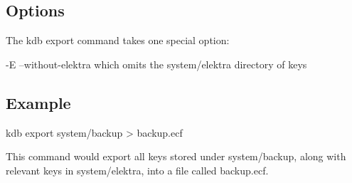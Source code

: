 \subsection*{Options}

The kdb export command takes one special option\+: \begin{DoxyVerb}    -E --without-elektra                    which omits the system/elektra directory of keys
\end{DoxyVerb}


\subsection*{Example}

\begin{DoxyVerb}    kdb export system/backup > backup.ecf
\end{DoxyVerb}


This command would export all keys stored under system/backup, along with relevant keys in system/elektra, into a file called backup.\+ecf. 
